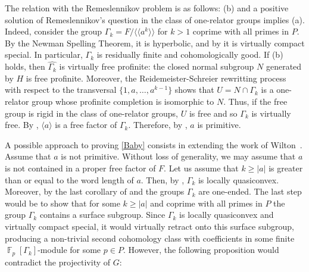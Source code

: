 \documentclass[a4paper]{amsart}
\theoremstyle{definition}
\theoremstyle{remark}
\DeclareMathOperator{\bbf}{\mathbb{F}}
\newcommand{\Falgebra}[1]{\bbf_p[#1]}
\begin{document}
The relation with the Remeslennikov problem is as follows: \textup{(b)} and a positive solution of Remeslennikov's question in the class of one-relator groups implies \textup{(a)}. Indeed, consider the group \(\Gamma_k = F/\langle\!\langle a^k\rangle\!\rangle\) for \(k > 1\) coprime with all primes in \(P\). By the Newman Spelling Theorem, it is hyperbolic, and by \cite{Wi21} it is virtually compact special. In particular, \(\Gamma_k\) is residually finite and cohomologically good. If \textup{(b)} holds, then \(\widehat{\Gamma_k}\) is virtually free profinite: the closed normal subgroup \(N\) generated by \(H\) is free profinite. Moreover, the Reidemeister-Schreier rewritting process with respect to the transversal \(\{1,a,\ldots,a^{k-1}\}\) shows that \(U = N \cap \Gamma_k\) is a one-relator group whose profinite completion is isomorphic to \(N\). Thus, if the free group is rigid in the class of one-relator groups, \(U\) is free and so \(\Gamma_k\) is virtually free. By \cite{garridoFreeFactorsProfinite2023}, \(\langle a \rangle\) is a free factor of \(\Gamma_k\). Therefore, by \cite[Prop. III.3.7]{LSbook}, \(a\) is primitive.

A possible approach to proving \cref{Baby} consists in extending the work of Wilton~\cite{Wi18}. Assume that \(a\) is not primitive.
 Without loss of generality, we may assume that $a$ is not contained in a proper free factor of \(F\). Let us assume that \(k \geq |a|\) is greater than or equal to the word length of \(a\). Then, by \cite[Thm 5.7]{HW01}, \(\Gamma_k\) is locally quasiconvex. Moreover, by the last corollary of \cite{FKS72} and \cite[Prop. III.3.7]{LSbook} the groups \(\Gamma_k\) are one-ended. The last step would be to show that for some \(k \geq |a|\) and coprime with all primes in \(P\) the group \(\Gamma_k\) contains a surface subgroup. Since \(\Gamma_k\) is locally quasiconvex and virtually compact special, it would virtually retract onto this surface subgroup, producing a non-trivial second cohomology class with coefficients in some finite \(\Falgebra{\Gamma_k}\)-module for some \(p \in P\). However, the following proposition would contradict the projectivity of \(G\):
\end{document}
